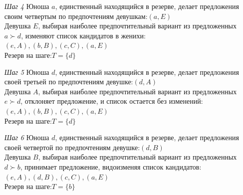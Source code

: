 \documentclass{article}
\begin{document}
\begin{enumerate}
\begin{enumerate}
    \item[\textit{Шаг 4}] Юноша $a$, единственный находящийся в резерве, делает предложения своим четвертым по предпочтениям девушкам:\qquad $(a,E)$\\
    Девушка $E$, выбирая наиболее предпочтительный вариант из предложенных \quad\textemdash\quad $a \succ d$, изменяют список кандидатов в женихи:\qquad $(e,A),(b,B),(c,C),(a,E)$\\
    Резерв на шаге:\qquad $T =\{d\}$
    
    \item[\textit{Шаг 5}] Юноша $d$, единственный находящийся в резерве, делает предложения своей третьей по предпочтениям девушке:\qquad $(d,A)$\\
    Девушка $A$, выбирая наиболее предпочтительный вариант из предложенных \quad\textemdash\quad $e \succ d$, отклоняет предложение, и список остается без изменений:\qquad  $(e,A),(b,B),(c,C),(a,E)$\\
    Резерв на шаге:\qquad $T =\{d\}$
    
    \item[\textit{Шаг 6}] Юноша $d$, единственный находящийся в резерве, делает предложения своей четвертой по предпочтениям девушке:\qquad $(d,B)$\\
    Девушка $B$, выбирая наиболее предпочтительный вариант из предложенных \quad\textemdash\quad $d \succ b$, принимает предложение, видоизменяя список кандидатов:\qquad $(e,A),(d,B),(c,C),(a,E)$\\
    Резерв на шаге:\qquad $T =\{b\}$


\end{enumerate}
\end{enumerate}
\end{document}

